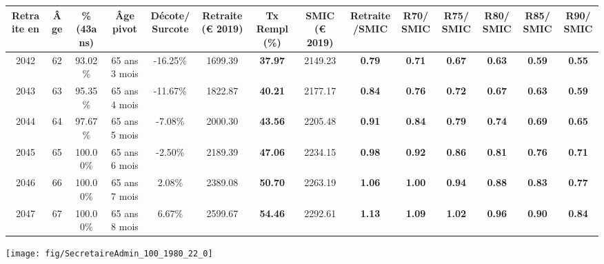 \begin{adjustbox}{max width=\textwidth} 
\begin{tabular}[htb]{|c|c||c|c|c||c|c||c|c||c|c|c|c|c|} 
\hline 
 Retraite en &  Âge &  \%(43ans) &  Âge pivot &  Décote/Surcote &  Retraite (\euro{} 2019) &  Tx Rempl(\%) &  SMIC (\euro{} 2019) &  Retraite/SMIC &  R70/SMIC &  R75/SMIC &  R80/SMIC &  R85/SMIC &  R90/SMIC \\ 
\hline \hline 
 2042 &  62 &  93.02\% &  65 ans 3 mois &  -16.25\% &  1699.39 &  {\bf 37.97} &  2149.23 &  {\bf {\color{red} 0.79}} &  {\bf {\color{red} 0.71}} &  {\bf {\color{red} 0.67}} &  {\bf {\color{red} 0.63}} &  {\bf {\color{red} 0.59}} &  {\bf {\color{red} 0.55}} \\ 
\hline 
 2043 &  63 &  95.35\% &  65 ans 4 mois &  -11.67\% &  1822.87 &  {\bf 40.21} &  2177.17 &  {\bf {\color{red} 0.84}} &  {\bf {\color{red} 0.76}} &  {\bf {\color{red} 0.72}} &  {\bf {\color{red} 0.67}} &  {\bf {\color{red} 0.63}} &  {\bf {\color{red} 0.59}} \\ 
\hline 
 2044 &  64 &  97.67\% &  65 ans 5 mois &  -7.08\% &  2000.30 &  {\bf 43.56} &  2205.48 &  {\bf {\color{red} 0.91}} &  {\bf {\color{red} 0.84}} &  {\bf {\color{red} 0.79}} &  {\bf {\color{red} 0.74}} &  {\bf {\color{red} 0.69}} &  {\bf {\color{red} 0.65}} \\ 
\hline 
 2045 &  65 &  100.00\% &  65 ans 6 mois &  -2.50\% &  2189.39 &  {\bf 47.06} &  2234.15 &  {\bf {\color{red} 0.98}} &  {\bf {\color{red} 0.92}} &  {\bf {\color{red} 0.86}} &  {\bf {\color{red} 0.81}} &  {\bf {\color{red} 0.76}} &  {\bf {\color{red} 0.71}} \\ 
\hline 
 2046 &  66 &  100.00\% &  65 ans 7 mois &  2.08\% &  2389.08 &  {\bf 50.70} &  2263.19 &  {\bf 1.06} &  {\bf 1.00} &  {\bf {\color{red} 0.94}} &  {\bf {\color{red} 0.88}} &  {\bf {\color{red} 0.83}} &  {\bf {\color{red} 0.77}} \\ 
\hline 
 2047 &  67 &  100.00\% &  65 ans 8 mois &  6.67\% &  2599.67 &  {\bf 54.46} &  2292.61 &  {\bf 1.13} &  {\bf 1.09} &  {\bf 1.02} &  {\bf {\color{red} 0.96}} &  {\bf {\color{red} 0.90}} &  {\bf {\color{red} 0.84}} \\ 
\hline 
\hline 
\end{tabular} 
\end{adjustbox} 
 
 \vspace{0.1cm} 

 {\hspace{-2.2cm}\texttt{[image: fig/SecretaireAdmin\_100\_1980\_22\_0]}} 

